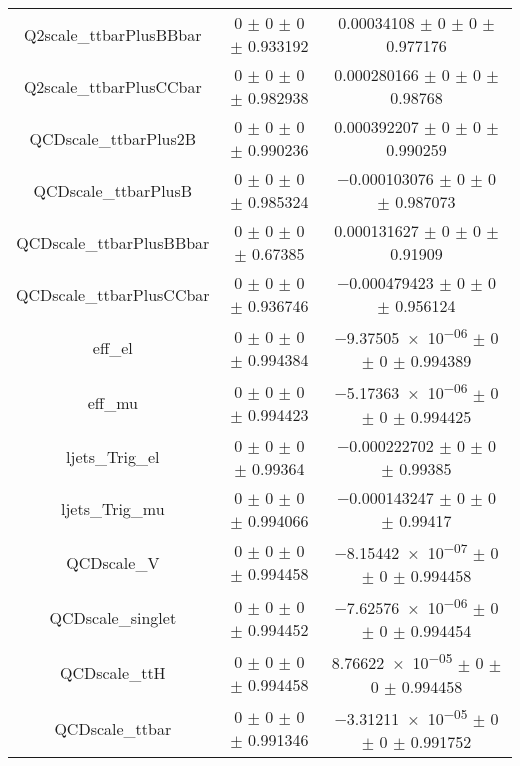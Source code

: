 \begin{table}
\begin{tabular}{ccc}
Q2scale\_ttbarPlusBBbar & \num{0} $\pm$ \num{0} $\pm$ \num{0} $\pm$ \num{0.933192} & \num{0.00034108} $\pm$ \num{0} $\pm$ \num{0} $\pm$ \num{0.977176}\\
Q2scale\_ttbarPlusCCbar & \num{0} $\pm$ \num{0} $\pm$ \num{0} $\pm$ \num{0.982938} & \num{0.000280166} $\pm$ \num{0} $\pm$ \num{0} $\pm$ \num{0.98768}\\
QCDscale\_ttbarPlus2B & \num{0} $\pm$ \num{0} $\pm$ \num{0} $\pm$ \num{0.990236} & \num{0.000392207} $\pm$ \num{0} $\pm$ \num{0} $\pm$ \num{0.990259}\\
QCDscale\_ttbarPlusB & \num{0} $\pm$ \num{0} $\pm$ \num{0} $\pm$ \num{0.985324} & \num{-0.000103076} $\pm$ \num{0} $\pm$ \num{0} $\pm$ \num{0.987073}\\
QCDscale\_ttbarPlusBBbar & \num{0} $\pm$ \num{0} $\pm$ \num{0} $\pm$ \num{0.67385} & \num{0.000131627} $\pm$ \num{0} $\pm$ \num{0} $\pm$ \num{0.91909}\\
QCDscale\_ttbarPlusCCbar & \num{0} $\pm$ \num{0} $\pm$ \num{0} $\pm$ \num{0.936746} & \num{-0.000479423} $\pm$ \num{0} $\pm$ \num{0} $\pm$ \num{0.956124}\\
eff\_el & \num{0} $\pm$ \num{0} $\pm$ \num{0} $\pm$ \num{0.994384} & \num{-9.37505e-06} $\pm$ \num{0} $\pm$ \num{0} $\pm$ \num{0.994389}\\
eff\_mu & \num{0} $\pm$ \num{0} $\pm$ \num{0} $\pm$ \num{0.994423} & \num{-5.17363e-06} $\pm$ \num{0} $\pm$ \num{0} $\pm$ \num{0.994425}\\
ljets\_Trig\_el & \num{0} $\pm$ \num{0} $\pm$ \num{0} $\pm$ \num{0.99364} & \num{-0.000222702} $\pm$ \num{0} $\pm$ \num{0} $\pm$ \num{0.99385}\\
ljets\_Trig\_mu & \num{0} $\pm$ \num{0} $\pm$ \num{0} $\pm$ \num{0.994066} & \num{-0.000143247} $\pm$ \num{0} $\pm$ \num{0} $\pm$ \num{0.99417}\\
QCDscale\_V & \num{0} $\pm$ \num{0} $\pm$ \num{0} $\pm$ \num{0.994458} & \num{-8.15442e-07} $\pm$ \num{0} $\pm$ \num{0} $\pm$ \num{0.994458}\\
QCDscale\_singlet & \num{0} $\pm$ \num{0} $\pm$ \num{0} $\pm$ \num{0.994452} & \num{-7.62576e-06} $\pm$ \num{0} $\pm$ \num{0} $\pm$ \num{0.994454}\\
QCDscale\_ttH & \num{0} $\pm$ \num{0} $\pm$ \num{0} $\pm$ \num{0.994458} & \num{8.76622e-05} $\pm$ \num{0} $\pm$ \num{0} $\pm$ \num{0.994458}\\
QCDscale\_ttbar & \num{0} $\pm$ \num{0} $\pm$ \num{0} $\pm$ \num{0.991346} & \num{-3.31211e-05} $\pm$ \num{0} $\pm$ \num{0} $\pm$ \num{0.991752}\\

\end{tabular}
\end{table}
